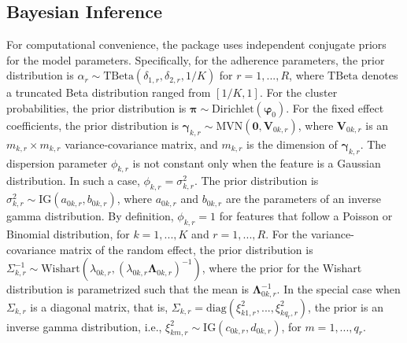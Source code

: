 
\subsection{Bayesian Inference}

For computational convenience, the  package uses independent conjugate priors for the model parameters. Specifically, for the adherence parameters, the prior distribution is $\alpha_r \sim \text{TBeta}(\delta_{1,r}, \delta_{2,r}, 1/K)$ for $r = 1,...,R$, where $\text{TBeta}$ denotes a truncated Beta distribution ranged from $[1/K, 1]$. For the cluster probabilities, the prior distribution is $\boldsymbol{\pi}\sim \text{Dirichlet}(\boldsymbol{\varphi}_0)$. For the fixed effect coefficients, the prior distribution is $\boldsymbol{\gamma}_{k,r} \sim \text{MVN}(\boldsymbol{0},\boldsymbol{V}_{0k,r})$, where $\boldsymbol{V}_{0k,r}$ is an $m_{k,r} \times m_{k,r}$ variance-covariance matrix, and $m_{k,r}$ is the dimension of $\boldsymbol{\gamma}_{k,r}$. The dispersion parameter $\phi_{k,r}$ is not constant only when the feature is a Gaussian distribution. In such a case, $\phi_{k,r} = \sigma^2_{k,r}$. The prior distribution is $\sigma^2_{k,r} \sim \text{IG}(a_{0k,r},b_{0k,r}) $, where $a_{0k,r}$ and $b_{0k,r}$ are the parameters of an inverse gamma distribution. By definition, $\phi_{k,r} = 1$ for features that follow a Poisson or Binomial distribution, for $k=1,...,K$ and $r=1,...,R$. For the variance-covariance matrix of the random effect, the prior distribution is $\Sigma_{k,r}^{-1} \sim \text{Wishart}(\lambda_{0k,r}, (\lambda_{0k,r}\boldsymbol{\Lambda}_{0k,r})^{-1} )$, where the prior for the Wishart distribution is parametrized such that the mean is $\boldsymbol{\Lambda}_{0k,r}^{-1}$. In the special case when $\Sigma_{k,r}$ is a diagonal matrix, that is, $\Sigma_{k,r} = \text{diag}(\xi^2_{k1,r},...,\xi^2_{kq_r,r})$, the prior is an inverse gamma distribution, i.e., $\xi^2_{km,r} \sim \text{IG}(c_{0k,r},d_{0k,r})$, for $m = 1,..., q_r$. 

